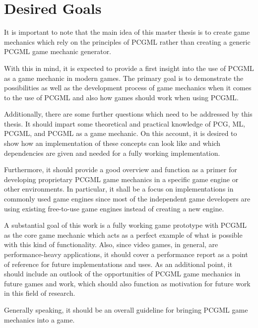 \documentclass[MGS,Master,english]{twbook}%
\begin{document}
\section{Desired Goals}
It is important to note that the main idea of this master thesis is to create game mechanics which rely on the principles of \ac{PCGML} rather than creating a generic \ac{PCGML} game mechanic generator.

With this in mind, it is expected to provide a first insight into the use of \ac{PCGML} as a game mechanic in modern games. The primary goal is to demonstrate the possibilities as well as the development process of game mechanics when it comes to the use of \ac{PCGML} and also how games should work when using \ac{PCGML}.

Additionally, there are some further questions which need to be addressed by this thesis. It should impart some theoretical and practical knowledge of \ac{PCG}, \ac{ML}, \ac{PCGML}, and \ac{PCGML} as a game mechanic. On this account, it is desired to show how an implementation of these concepts can look like and which dependencies are given and needed for a fully working implementation. 

Furthermore, it should provide a good overview and function as a primer for developing proprietary \ac{PCGML} game mechanics in a specific game engine or other environments. In particular, it shall be a focus on implementations in commonly used game engines since most of the independent game developers are using existing free-to-use game engines instead of creating a new engine. 

A substantial goal of this work is a fully working game prototype with \ac{PCGML} as the core game mechanic which acts as a perfect example of what is possible with this kind of functionality. Also, since video games, in general, are performance-heavy applications, it should cover a performance report as a point of reference for future implementations and uses. As an additional point, it should include an outlook of the opportunities of \ac{PCGML} game mechanics in future games and work, which should also function as motivation for future work in this field of research.

Generally speaking, it should be an overall guideline for bringing \ac{PCGML} game mechanics into a game.
\end{document}
